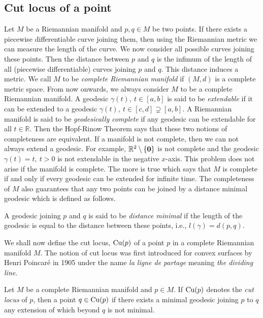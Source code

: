 \subsection{Cut locus of a point}\label{subsec:CutLocusOfAPoint}
\hfb Let $M$ be a Riemannian manifold and $p,q\in M$ be two points. If there exists a piecewise differentiable curve joining them, then using the Riemannian metric we can measure the length of the curve. We now consider all possible curves joining these points. Then the distance between $p$ and $q$ is the infimum of the length of all (piecewise differentiable) curves joining $p$ and $q$. This distance induces a metric. We call $M$ to be \textit{complete Riemannian manifold} if $(M,d)$ is a complete metric space. From now onwards, we always consider $M$ to be a complete Riemannian manifold. A geodesic $\gamma(t),~t\in[a,b]$ is said to be \emph{extendable} if it can be extended to a geodesic $\gamma(t),~t\in[c,d]\supsetneq [a,b]$. A Riemannian manifold is said to be \textit{geodesically complete} if any geodesic can be extendable for all $t\in \mathbb{R}$. Then the Hopf-Rinow Theorem \cite{HoRi31} says that these two notions of completeness are equivalent. If a manifold is not complete, then we can not always extend a geodesic. For example, $\mathbb{R}^2\setminus\{\bf{0}\}$ is not complete and the geodesic $\gamma(t)=t,~t>0$ is not extendable in the negative $x$-axis. This problem does not arise if the manifold is complete. The more is true which says that $M$ is complete if and only if every geodesic can be extended for infinite time. The completeness of $M$ also guarantees that any two points can be joined by a distance minimal geodesic which is defined as follows.

\begin{defn}
    A geodesic joining $p$ and $q$ is said to be \textit{distance minimal} if the length of the geodesic is equal to the distance between these points, i.e., $l(\gamma)=d(p,q)$.
\end{defn}

\vspace{0.1cm}
\hf We shall now define the cut locus, $\cutn[p]$ of a point $p$ in a complete Riemannian manifold $M$. The notion of cut locus was first introduced for convex surfaces by Henri Poincar\'{e} \cite{Poin05} in 1905 under the name \textit{la ligne de partage} meaning \textit{the dividing line}.

\begin{defn}\label{defn:cutLocusOfPoint}
    Let $M$ be a complete Riemannian manifold and $p\in M$. If $\cu$ denotes the \emph{cut locus} of $p$, then a point $q\in \cu$ if there exists a minimal geodesic joining $p$ to $q$ any extension of which beyond $q$ is not minimal. 
\end{defn}

